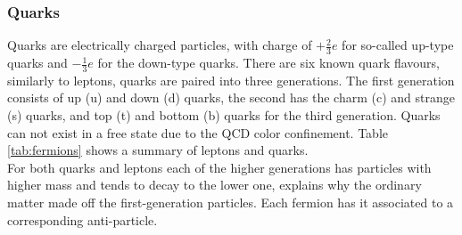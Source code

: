 \subsubsection{Quarks}
Quarks are electrically charged particles, with charge of $+\frac{2}{3}e$ for so-called up-type quarks and $-\frac{1}{3}e$ for the down-type quarks. There are six known quark flavours, similarly to leptons, quarks are paired into three generations. The first generation consists of up (u) and down (d) quarks, the second has the charm (c) and strange (s) quarks, and top (t) and bottom (b) quarks for the third generation. Quarks can not exist in a free state due to the QCD color confinement. Table \ref{tab:fermions} shows a summary of leptons and quarks. \\
For both quarks and leptons each of the higher generations has particles with higher mass and tends to decay to the lower one, explains why the ordinary matter made off the first-generation particles. Each  fermion has it associated to a corresponding anti-particle.
